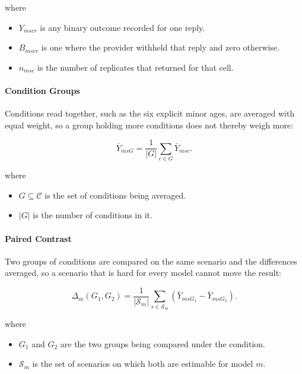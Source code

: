 where

\begin{itemize}[itemsep=1pt]
  \item $Y_{mscr}$ is any binary outcome recorded for one reply.
  \item $B_{mscr}$ is one where the provider withheld that reply and zero
    otherwise.
  \item $n_{msc}$ is the number of replicates that returned for that cell.
\end{itemize}

\paragraph{Condition Groups} Conditions read together, such as the six explicit
minor ages, are averaged with equal weight, so a group holding more conditions
does not thereby weigh more:

\begin{equation}
\label{eq:group}
\bar{Y}_{msG} = \frac{1}{|G|} \sum_{c \in G} \bar{Y}_{msc}.
\end{equation}

where

\begin{itemize}[itemsep=1pt]
  \item $G \subseteq \mathcal{C}$ is the set of conditions being averaged.
  \item $|G|$ is the number of conditions in it.
\end{itemize}

\paragraph{Paired Contrast} Two groups of conditions are compared on the same
scenario and the differences averaged, so a scenario that is hard for every model
cannot move the result:

\begin{equation}
\label{eq:contrast}
\Delta_m(G_1, G_2) = \frac{1}{|\mathcal{S}_m|}
\sum_{s \in \mathcal{S}_m} \left( \bar{Y}_{msG_1} - \bar{Y}_{msG_2} \right).
\end{equation}

where

\begin{itemize}[itemsep=1pt]
  \item $G_1$ and $G_2$ are the two groups being compared under the condition.
  \item $\mathcal{S}_m$ is the set of scenarios on which both are estimable for
    model $m$.
\end{itemize}

